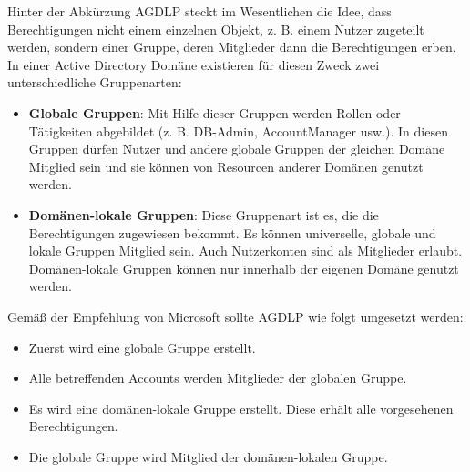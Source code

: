         Hinter der Abkürzung AGDLP steckt im Wesentlichen die Idee, dass
        Berechtigungen nicht einem einzelnen Objekt, z. B. einem Nutzer
        zugeteilt werden, sondern einer Gruppe, deren Mitglieder dann die
        Berechtigungen erben. In einer Active Directory Domäne existieren für
        diesen Zweck zwei unterschiedliche Gruppenarten:
          \begin{itemize}
              \item \textbf{Globale Gruppen}: Mit Hilfe dieser Gruppen werden
              Rollen oder Tätigkeiten abgebildet (z. B. DB-Admin, AccountManager
              usw.). In diesen Gruppen dürfen Nutzer und andere globale Gruppen
              der gleichen Domäne Mitglied sein und sie können von Resourcen
              anderer Domänen genutzt werden.
              \item \textbf{Domänen-lokale Gruppen}: Diese Gruppenart ist es, die die
              Berechtigungen zugewiesen bekommt. Es können universelle, globale
              und lokale Gruppen Mitglied sein. Auch Nutzerkonten sind als
              Mitglieder erlaubt. Domänen-lokale Gruppen können nur innerhalb der
              eigenen Domäne genutzt werden.
          \end{itemize}
          Gemäß der Empfehlung von Microsoft sollte AGDLP wie folgt umgesetzt
          werden:
          \begin{itemize}
              \item Zuerst wird eine globale Gruppe erstellt.
              \item Alle betreffenden Accounts werden Mitglieder der globalen
              Gruppe.
              \item Es wird eine domänen-lokale Gruppe erstellt. Diese erhält alle
              vorgesehenen Berechtigungen.
              \item Die globale Gruppe wird Mitglied der domänen-lokalen Gruppe.
          \end{itemize}
          \begin{literaturinternet}
            \item \cite{AGDLP}
          \end{literaturinternet}
